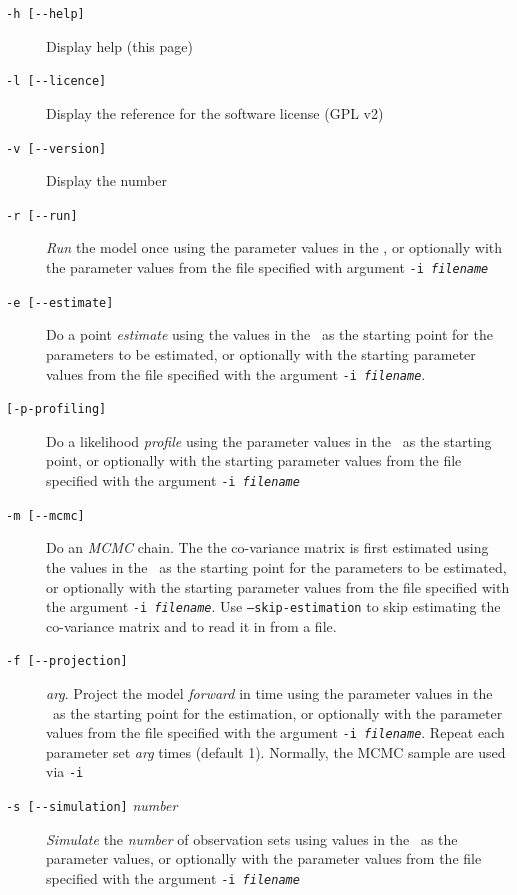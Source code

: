 \begin{description}
\item [\texttt{-h [-{}-help]}] Display help (this page)
\item [\texttt{-l [-{}-licence]}] Display the reference for the software license (GPL v2)
\item [\texttt{-v [-{}-version]}] Display the \CNAME\version number

\item [\texttt{-r [-{}-run]}] \emph{Run} the model once using the parameter values in the \config, or optionally with the parameter values from the file specified with argument \texttt{-i \emph{filename}}

\item [\texttt{-e [-{}-estimate]}] Do a point \emph{estimate} using the values in the \config\ as the starting point for the parameters to be estimated, or optionally with the starting parameter values from the file specified with the argument \texttt{-i \emph{filename}}.

\item [\texttt{[-{p}-profiling]}] Do a likelihood \emph{profile} using the parameter values in the \config\ as the starting point, or optionally with the starting parameter values from the file specified with the argument \texttt{-i \emph{filename}}

\item [\texttt{-m [-{}-mcmc]}] Do an \emph{MCMC} chain. The the co-variance matrix is first estimated using the values in the \config\ as the starting point for the parameters to be estimated, or optionally with the starting parameter values from the file specified with the argument \texttt{-i \emph{filename}}. Use \texttt{--skip-estimation} to skip estimating the co-variance matrix and to read it in from a file.

\item [\texttt{-f [-{}-projection]}] \emph{arg}. Project the model \emph{forward} in time using the parameter values in the \config\ as the starting point for the estimation, or optionally with the parameter values from the file specified with the argument \texttt{-i \emph{filename}}. Repeat each parameter set \emph{arg} times (default 1). Normally, the MCMC sample are used via \texttt{-i}

\item [\texttt{-s [-{}-simulation]} \emph{number}] \emph{Simulate} the \emph{number} of observation sets using values in the \config\ as the parameter values, or optionally with the parameter values from the file specified with the argument \texttt{-i \emph{filename}}
\end{description}

